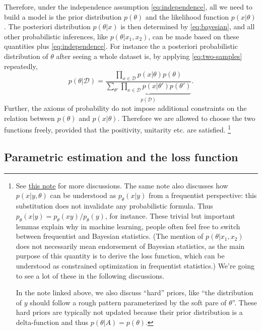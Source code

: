 \documentclass[hyperref, a4paper, 12pt]{report}
\begin{document}
Therefore, under the independence assumption \eqref{eq:independence}, 
all we need to build a model is the prior distribution $p(\theta)$ and the likelihood function $p(x | \theta)$.
The posteriori distribution $p(\theta | x)$ is then determined by \eqref{eq:bayesian},
and all other probabilistic inferences, like $p(\theta | x_1, x_2)$, can be made based on these quantities plus \eqref{eq:independence}.
For instance the a posteriori probabilistic distribution of $\theta$ after seeing a whole dataset is, by applying \eqref{eq:two-samples} repeatedly,
\begin{equation}
    p(\theta | \mathcal{D}) =  \frac{
        \prod_{x \in \mathcal{D}} p(x |\theta) p(\theta)
    }{
        \underbrace{\sum_{\theta'} \prod_{x \in \mathcal{D}} p(x | \theta') p(\theta')}_{p(\mathcal{D})}
    }.
    \label{eq:dataset-posterior}
\end{equation}
Further, the axioms of probability do not impose additional constraints on the relation between $p(\theta)$ and $p(x | \theta)$.
Therefore we are allowed to choose the two functions freely,
provided that the positivity, unitarity etc. are satisfied.%
\footnote{
    See \href{../../Math/Statistics/bayesian.pdf}{this note} for more discussions.
    The same note also discusses how $p (x | y, \theta)$ can be understood as $p_\theta(x | y)$ from a frequentist perspective:
    this substitution does not invalidate any probabilistic formula.
    Thus $p_\theta(x | y) = p_\theta(xy) / p_\theta(y)$, for instance.
    These trivial but important lemmas explain why in machine learning,
    people often feel free to switch between frequentist and Bayesian statistics.
    (The mention of $p(\theta | x_1, x_2)$ does not necessarily mean endorsement of Bayesian statistics, as the main purpose of this quantity is to derive the loss function, which can be understood as constrained optimization in frequentist statistics.)
    We're going to see a lot of these in the following discussions.

    In the note linked above, we also discuss ``hard'' priors, 
    like ``the distribution of $y$ should follow a rough pattern parameterized by the soft pare of $\theta$''.
    These hard priors are typically not updated 
    because their prior distribution is a delta-function and thus $p(\theta | A) = p(\theta)$. 
}

\subsection{Parametric estimation and the loss function}
\end{document}
